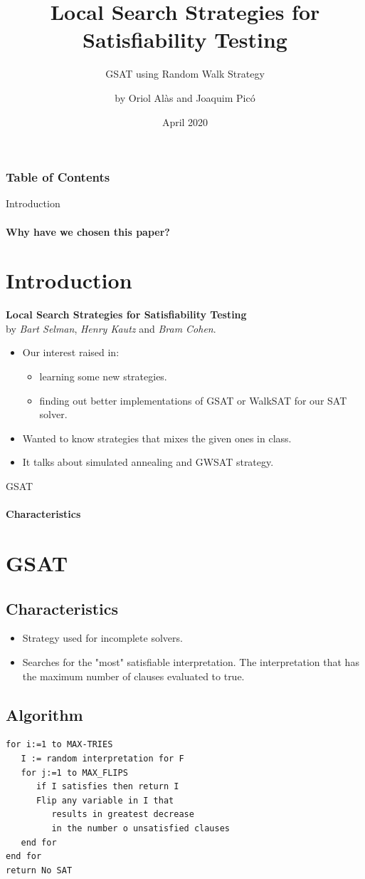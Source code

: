 \documentclass{beamer}
\title{Local Search Strategies for Satisfiability Testing}
\subtitle{GSAT using Random Walk Strategy}
\author{by Oriol Alàs and Joaquim Picó}
\date{April 2020}
\begin{document}
\maketitle
\begin{frame}
\frametitle{Table of Contents}
\tableofcontents
\end{frame}

\begin{frame}{Introduction}
\framesubtitle{Why have we chosen this paper?}
\section{Introduction}
\textbf{Local Search Strategies for Satisfiability Testing} \\by \textit{Bart Selman}, \textit{Henry Kautz} and \textit{Bram Cohen}.
\linebreak
\begin{itemize}
	\item Our interest raised in:
	\begin{itemize}
		\item  learning some new strategies.
		\item finding out better implementations of GSAT or WalkSAT for our SAT solver.
	\end{itemize}
	\item Wanted to know strategies that mixes the given ones in class.
	\item It talks about simulated annealing and GWSAT strategy.
\end{itemize}
\end{frame}
\begin{frame}{GSAT}
\framesubtitle{Characteristics}
\section{GSAT}
\subsection{Characteristics}
\begin{itemize}
	\item Strategy used for incomplete solvers.
    \item Searches for the "most" satisfiable interpretation. The interpretation that has the maximum number of clauses evaluated to true.
\end{itemize}
\end{frame}
\begin{frame}[fragile]
\subsection{Algorithm}
\begin{verbatim}
for i:=1 to MAX-TRIES
   I := random interpretation for F
   for j:=1 to MAX_FLIPS
      if I satisfies then return I
      Flip any variable in I that
         results in greatest decrease
         in the number o unsatisfied clauses
   end for
end for
return No SAT
\end{verbatim}
\end{frame}
\end{document}
